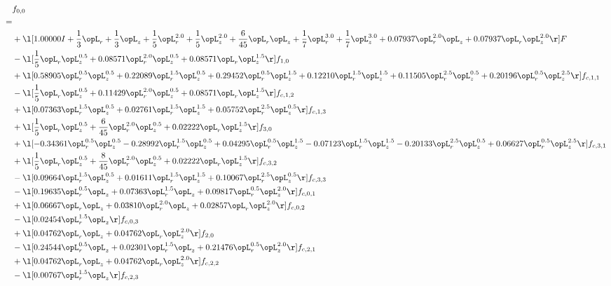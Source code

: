 \begin{alignat}{2} 
\label{eq:f_00_2} 
& f_{0,0} \nonumber \\ 
 = \\ 
& + \l[  1.00000 I + \frac{1}{3} \opL_r + \frac{1}{3} \opL_z + \frac{1}{5} \opL_r^{2.0} + \frac{1}{5} \opL_z^{2.0} + \frac{6}{45} \opL_r \opL_z + \frac{1}{7} \opL_r^{3.0} + \frac{1}{7} \opL_z^{3.0} +  0.07937 \opL_r^{2.0} \opL_z +  0.07937 \opL_r \opL_z^{2.0}  \r] F \nonumber \\ 
& - \l[ \frac{1}{5} \opL_r \opL_z^{0.5} +  0.08571 \opL_r^{2.0} \opL_z^{0.5} +  0.08571 \opL_r \opL_z^{1.5}  \r] f_{1,0} \nonumber \\ 
& + \l[  0.58905 \opL_r^{0.5} \opL_z^{0.5} +  0.22089 \opL_r^{1.5} \opL_z^{0.5} +  0.29452 \opL_r^{0.5} \opL_z^{1.5} +  0.12210 \opL_r^{1.5} \opL_z^{1.5} +  0.11505 \opL_r^{2.5} \opL_z^{0.5} +  0.20196 \opL_r^{0.5} \opL_z^{2.5}  \r] f_{c,1,1} \nonumber \\ 
& - \l[ \frac{1}{5} \opL_r \opL_z^{0.5} +  0.11429 \opL_r^{2.0} \opL_z^{0.5} +  0.08571 \opL_r \opL_z^{1.5}  \r] f_{c,1,2} \nonumber \\ 
& + \l[  0.07363 \opL_r^{1.5} \opL_z^{0.5} +  0.02761 \opL_r^{1.5} \opL_z^{1.5} +  0.05752 \opL_r^{2.5} \opL_z^{0.5}  \r] f_{c,1,3} \nonumber \\ 
& + \l[ \frac{1}{5} \opL_r \opL_z^{0.5} + \frac{6}{45} \opL_r^{2.0} \opL_z^{0.5} +  0.02222 \opL_r \opL_z^{1.5}  \r] f_{3,0} \nonumber \\ 
& + \l[  -0.34361 \opL_r^{0.5} \opL_z^{0.5}   -0.28992 \opL_r^{1.5} \opL_z^{0.5} +  0.04295 \opL_r^{0.5} \opL_z^{1.5}   -0.07123 \opL_r^{1.5} \opL_z^{1.5}   -0.20133 \opL_r^{2.5} \opL_z^{0.5} +  0.06627 \opL_r^{0.5} \opL_z^{2.5}  \r] f_{c,3,1} \nonumber \\ 
& + \l[ \frac{1}{5} \opL_r \opL_z^{0.5} + \frac{8}{45} \opL_r^{2.0} \opL_z^{0.5} +  0.02222 \opL_r \opL_z^{1.5}  \r] f_{c,3,2} \nonumber \\ 
& - \l[  0.09664 \opL_r^{1.5} \opL_z^{0.5} +  0.01611 \opL_r^{1.5} \opL_z^{1.5} +  0.10067 \opL_r^{2.5} \opL_z^{0.5}  \r] f_{c,3,3} \nonumber \\ 
& - \l[  0.19635 \opL_r^{0.5} \opL_z +  0.07363 \opL_r^{1.5} \opL_z +  0.09817 \opL_r^{0.5} \opL_z^{2.0}  \r] f_{c,0,1} \nonumber \\ 
& + \l[  0.06667 \opL_r \opL_z +  0.03810 \opL_r^{2.0} \opL_z +  0.02857 \opL_r \opL_z^{2.0}  \r] f_{c,0,2} \nonumber \\ 
& - \l[  0.02454 \opL_r^{1.5} \opL_z  \r] f_{c,0,3} \nonumber \\ 
& + \l[  0.04762 \opL_r \opL_z +  0.04762 \opL_r \opL_z^{2.0}  \r] f_{2,0} \nonumber \\ 
& - \l[  0.24544 \opL_r^{0.5} \opL_z +  0.02301 \opL_r^{1.5} \opL_z +  0.21476 \opL_r^{0.5} \opL_z^{2.0}  \r] f_{c,2,1} \nonumber \\ 
& + \l[  0.04762 \opL_r \opL_z +  0.04762 \opL_r \opL_z^{2.0}  \r] f_{c,2,2} \nonumber \\ 
& - \l[  0.00767 \opL_r^{1.5} \opL_z  \r] f_{c,2,3} \nonumber \\ 
\end{alignat} 


